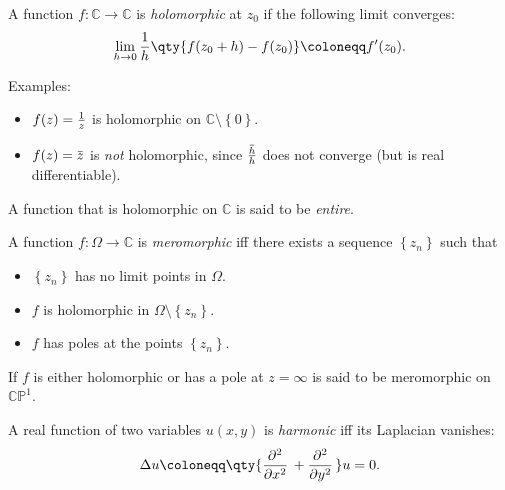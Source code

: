 \begin{definition}[Holomorphic]

A function \(f:{\mathbb{C}}\to {\mathbb{C}}\) is \emph{holomorphic} at
\(z_0\) if the following limit converges:
\begin{align*}  
\lim_{h\to 0} {1\over h} \qty{f(z_0 + h) - f(z_0)} \coloneqq f'(z_0)
.\end{align*}

\end{definition}

Examples:

\begin{itemize}
\tightlist
\item
  \(f(z) = {1\over z}\) is holomorphic on
  \({\mathbb{C}}\setminus\left\{{0}\right\}\).
\item
  \(f(z) = \mkern 1.5mu\overline{\mkern-1.5muz\mkern-1.5mu}\mkern 1.5mu\)
  is \emph{not} holomorphic, since
  \(\mkern 1.5mu\overline{\mkern-1.5muh\mkern-1.5mu}\mkern 1.5mu \over h\)
  does not converge (but is real differentiable).
\end{itemize}

\begin{definition}[Entire]

A function that is holomorphic on \({\mathbb{C}}\) is said to be
\emph{entire}.

\end{definition}

\begin{definition}[Meromorphic]

A function \(f:\Omega\to{\mathbb{C}}\) is \emph{meromorphic} iff there
exists a sequence \(\left\{{z_n}\right\}\) such that

\begin{itemize}
\tightlist
\item
  \(\left\{{z_n}\right\}\) has no limit points in \(\Omega\).
\item
  \(f\) is holomorphic in \(\Omega\setminus\left\{{z_n}\right\}\).
\item
  \(f\) has poles at the points \(\left\{{z_n}\right\}\).
\end{itemize}

If \(f\) is either holomorphic or has a pole at \(z=\infty\) is said to
be meromorphic on \({\mathbb{CP}}^1\).

\end{definition}

\begin{definition}[Harmonic]

A real function of two variables \(u(x, y)\) is \emph{harmonic} iff its
Laplacian vanishes:
\begin{align*}  
\Delta u \coloneqq\qty{{\frac{\partial ^2}{\partial x^2}\,} + {\frac{\partial ^2}{\partial y^2}\,}}u = 0
.\end{align*}

\end{definition}

